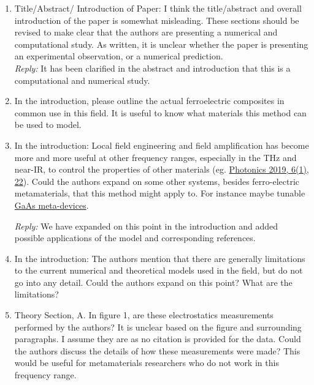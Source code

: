 \documentclass[%
 aip,
 amsmath,amssymb,
 reprint,%
]{revtex4-1}
\newcommand{\rep}[1]{\textcolor{reply}{\textit{Reply:} #1}}
\begin{document}
\begin{enumerate}
\item Title/Abstract/ Introduction of Paper: I think the title/abstract and overall introduction of the
 paper is somewhat misleading. These sections should be revised to make clear that the authors are
  presenting a numerical and computational study. As written, it is unclear whether the paper is presenting
   an experimental observation, or a numerical prediction.\\


\rep{It has been clarified in the abstract and introduction that this is a computational and numerical study.}



\item In the introduction, please outline the actual ferroelectric composites in common use in this field.
 It is useful to know what materials this method can be used to model.




\item In the introduction: Local field engineering and field amplification has become more and more useful
 at other frequency ranges, especially in the THz and near-IR, to control the properties of other materials
  (eg. \href{https://doi.org/10.3390/photonics6010022}{Photonics 2019, 6(1), 22}). Could the authors expand
   on some other systems, besides ferro-electric metamaterials, that this method might apply to. For
    instance maybe tunable
    \href{https://journals.aps.org/prl/abstract/10.1103/PhysRevLett.110.217404}{GaAs meta-devices}.

    \rep{We have expanded on this point in the introduction and added possible applications of the model and corresponding references.}


\item In the introduction: The authors mention that there are generally limitations to the current
 numerical and theoretical models used in the field, but do not go into any detail. Could the authors
  expand on this point? What are the limitations?

\item Theory Section, A. In figure 1, are these electrostatics measurements performed by the authors? It is
 unclear based on the figure and surrounding paragraphs. I assume they are as no citation is provided for
  the data. Could the authors discuss the details of how these measurements were made? This would be useful
   for metamaterials researchers who do not work in this frequency range.


\end{enumerate}
\end{document}
